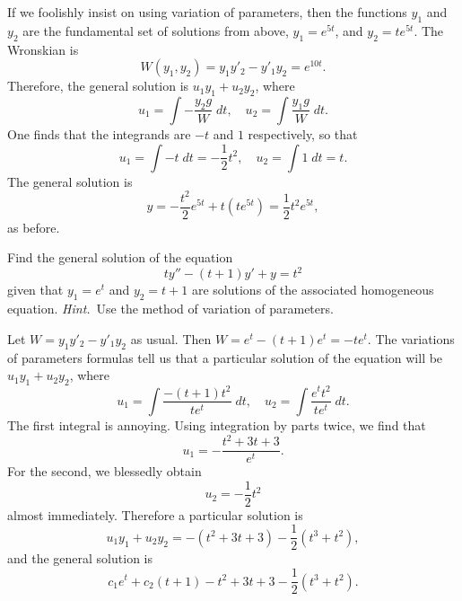 \documentclass[answers,12pt]{exam}
\begin{document}
\begin{questions}
\begin{solution}
    If we foolishly insist on using variation of parameters, then the functions $y_1$ and $y_2$ are the fundamental set of solutions from above, $y_1 = e^{5t}$, and $y_2 = te^{5t}$. The Wronskian is
    \[
        W(y_1, y_2) = y_1 y'_2 - y'_1 y_2 = e^{10 t}.
    \]
    Therefore, the general solution is $u_1 y_1 + u_2 y_2$, where
    \[
        u_1 = \int -\frac{y_2 g}{W} \; dt, \quad u_2 = \int \frac{y_1 g}{W} \; dt.
    \]
    One finds that the integrands are $-t$ and $1$ respectively, so that
    \[
        u_1 = \int -t \; dt = -\frac{1}{2} t^2, \quad u_2 = \int 1 \; dt = t.
    \]
    The general solution is 
    \[
        y = -\frac{t^2}{2} e^{5t} + t(te^{5t}) = \frac{1}{2} t^2 e^{5t},
    \]
    as before.
\end{solution}
\question Find the general solution of the equation 
    \[
        ty'' - (t+1)y' + y = t^2
    \]
given that $y_1 = e^t$ and $y_2 = t+1$ are solutions of the associated homogeneous equation. \emph{Hint.}~Use the method of variation of parameters.
\begin{solution} %
    Let $W = y_1 y'_2 - y'_1 y_2$ as usual. Then $W = e^t - (t+1) e^t = -te^t$. The variations of parameters formulas tell us that a particular solution of the equation will be $u_1 y_1 + u_2 y_2$, where
    \[
        u_1 = \int \frac{-(t+1) t^2}{te^t} \; dt, \quad u_2 = \int \frac{e^t t^2}{te^t} \; dt.
    \]
    The first integral is annoying. Using integration by parts twice, we find that 
    \[
        u_1 = -\frac{t^2 + 3t + 3}{e^{t}}.
    \]
    For the second, we blessedly obtain 
    \[
        u_2 = -\frac{1}{2} t^2
    \]
    almost immediately. Therefore a particular solution is
    \[
        u_1 y_1 + u_2 y_2 = -(t^2 + 3t + 3) - \frac{1}{2} (t^3 + t^2),
    \]
    and the general solution is
    \[
        c_1 e^t + c_2 (t+1) - t^2 + 3t + 3 - \frac{1}{2} (t^3 + t^2).
    \]
\end{solution}
\end{questions}
\end{document}
